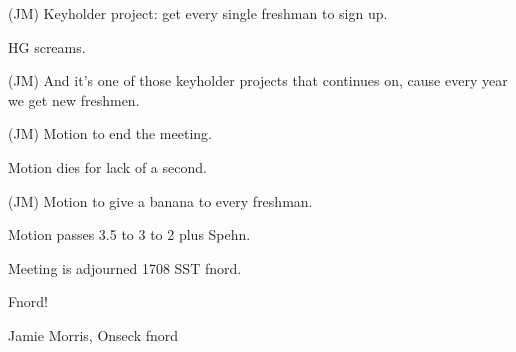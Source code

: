 (JM) Keyholder project:  get every single freshman to sign up.

HG screams.

(JM) And it's one of those keyholder projects that continues
on, cause every year we get new freshmen.

(JM) Motion to end the meeting.

Motion dies for lack of a second.

(JM) Motion to give a banana to every freshman.

Motion passes 3.5 to 3 to 2 plus Spehn.

Meeting is adjourned 1708 SST fnord.

\vspace{0.15in}
\begin{center}
Fnord!

Jamie Morris, Onseck fnord
\end{center}

